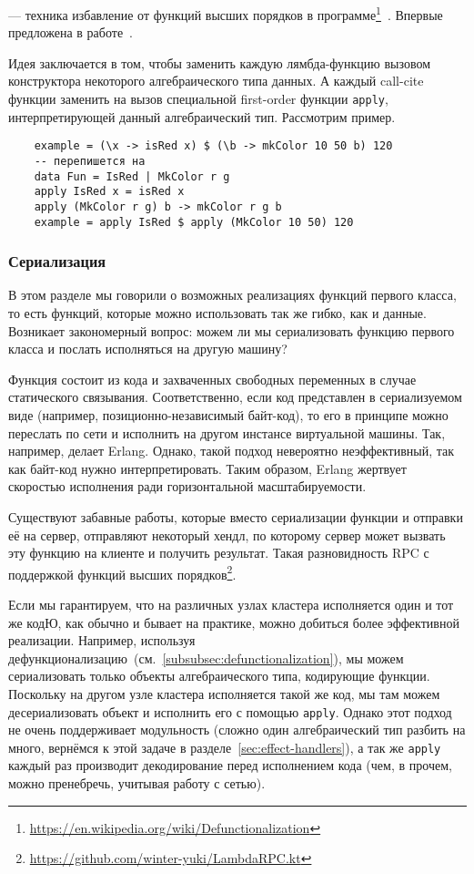  --- техника избавление от функций высших порядков в программе\footnote{\url{https://en.wikipedia.org/wiki/Defunctionalization}}~\cite{defunctionalization-slides}.
Впервые предложена в работе~\cite{reynolds1972definitional, reynolds1998definitional}.

Идея заключается в том, чтобы заменить каждую лямбда-функцию вызовом конструктора некоторого алгебраического типа данных.
А каждый call-cite функции заменить на вызов специальной first-order функции \texttt{apply}, интерпретирующей данный алгебраический тип.
Рассмотрим пример.

\begin{verbatim}
    example = (\x -> isRed x) $ (\b -> mkColor 10 50 b) 120
    -- перепишется на
    data Fun = IsRed | MkColor r g
    apply IsRed x = isRed x
    apply (MkColor r g) b -> mkColor r g b
    example = apply IsRed $ apply (MkColor 10 50) 120
\end{verbatim}

\subsubsection{Сериализация}

В этом разделе мы говорили о возможных реализациях функций первого класса, то есть функций, которые можно использовать так же гибко, как и данные.
Возникает закономерный вопрос: можем ли мы сериализовать функцию первого класса и послать исполняться на другую машину?

Функция состоит из кода и захваченных свободных переменных в случае статического связывания.
Соответственно, если код представлен в сериализуемом виде (например, позиционно-независимый байт-код), то его в принципе можно переслать по сети и исполнить на другом инстансе виртуальной машины.
Так, например, делает Erlang.
Однако, такой подход невероятно неэффективный, так как байт-код нужно интерпретировать.
Таким образом, Erlang жертвует скоростью исполнения ради горизонтальной масштабируемости.

Существуют забавные работы, которые вместо сериализации функции и отправки её на сервер, отправляют некоторый хендл, по которому сервер может вызвать эту функцию на клиенте и получить результат.
Такая разновидность RPC с поддержкой функций высших порядков\footnote{\url{https://github.com/winter-yuki/LambdaRPC.kt}}.

Если мы гарантируем, что на различных узлах кластера исполняется один и тот же кодЮ, как обычно и бывает на практике, можно добиться более эффективной реализации.
Например, используя дефункционализацию~(см.~\ref{subsubsec:defunctionalization}), мы можем сериализовать только объекты алгебраического типа, кодирующие функции.
Поскольку на другом узле кластера исполняется такой же код, мы там можем десериализовать объект и исполнить его с помощью \texttt{apply}.
Однако этот подход не очень поддерживает модульность (сложно один алгебраический тип разбить на много, вернёмся к этой задаче в разделе~\ref{sec:effect-handlers}), а так же \texttt{apply} каждый раз производит декодирование перед исполнением кода (чем, в прочем, можно пренебречь, учитывая работу с сетью).

